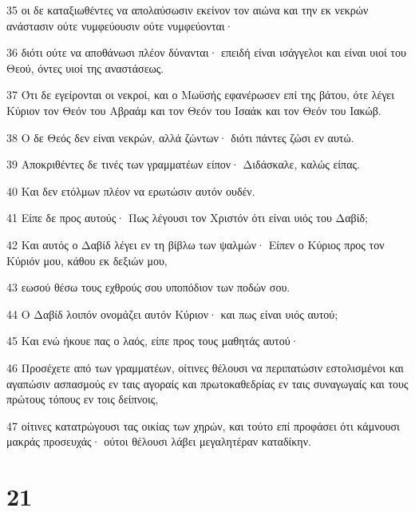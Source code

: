 \par 35 οι δε καταξιωθέντες να απολαύσωσιν εκείνον τον αιώνα και την εκ νεκρών ανάστασιν ούτε νυμφεύουσιν ούτε νυμφεύονται·
\par 36 διότι ούτε να αποθάνωσι πλέον δύνανται· επειδή είναι ισάγγελοι και είναι υιοί του Θεού, όντες υιοί της αναστάσεως.
\par 37 Ότι δε εγείρονται οι νεκροί, και ο Μωϋσής εφανέρωσεν επί της βάτου, ότε λέγει Κύριον τον Θεόν του Αβραάμ και τον Θεόν του Ισαάκ και τον Θεόν του Ιακώβ.
\par 38 Ο δε Θεός δεν είναι νεκρών, αλλά ζώντων· διότι πάντες ζώσι εν αυτώ.
\par 39 Αποκριθέντες δε τινές των γραμματέων είπον· Διδάσκαλε, καλώς είπας.
\par 40 Και δεν ετόλμων πλέον να ερωτώσιν αυτόν ουδέν.
\par 41 Είπε δε προς αυτούς· Πως λέγουσι τον Χριστόν ότι είναι υιός του Δαβίδ;
\par 42 Και αυτός ο Δαβίδ λέγει εν τη βίβλω των ψαλμών· Είπεν ο Κύριος προς τον Κύριόν μου, κάθου εκ δεξιών μου,
\par 43 εωσού θέσω τους εχθρούς σου υποπόδιον των ποδών σου.
\par 44 Ο Δαβίδ λοιπόν ονομάζει αυτόν Κύριον· και πως είναι υιός αυτού;
\par 45 Και ενώ ήκουε πας ο λαός, είπε προς τους μαθητάς αυτού·
\par 46 Προσέχετε από των γραμματέων, οίτινες θέλουσι να περιπατώσιν εστολισμένοι και αγαπώσιν ασπασμούς εν ταις αγοραίς και πρωτοκαθεδρίας εν ταις συναγωγαίς και τους πρώτους τόπους εν τοις δείπνοις,
\par 47 οίτινες κατατρώγουσι τας οικίας των χηρών, και τούτο επί προφάσει ότι κάμνουσι μακράς προσευχάς· ούτοι θέλουσι λάβει μεγαλητέραν καταδίκην.

\chapter{21}


